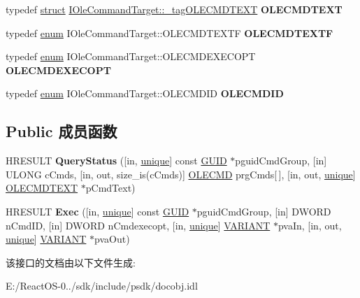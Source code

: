 \begin{DoxyCompactItemize}
\item 
\mbox{\label{interface_i_ole_command_target_a531d269b2d9c7d82670fb4628d83d94d}} 
typedef \hyperlink{interfacestruct}{struct} \hyperlink{struct_i_ole_command_target_1_1__tag_o_l_e_c_m_d_t_e_x_t}{I\+Ole\+Command\+Target\+::\+\_\+tag\+O\+L\+E\+C\+M\+D\+T\+E\+XT} {\bfseries O\+L\+E\+C\+M\+D\+T\+E\+XT}
\item 
\mbox{\label{interface_i_ole_command_target_ad0d07128baf01db2c74e7d0037519484}} 
typedef \hyperlink{interfaceenum}{enum} I\+Ole\+Command\+Target\+::\+O\+L\+E\+C\+M\+D\+T\+E\+X\+TF {\bfseries O\+L\+E\+C\+M\+D\+T\+E\+X\+TF}
\item 
\mbox{\label{interface_i_ole_command_target_a39f3fc8cac067ab8138fb5b3258b28e4}} 
typedef \hyperlink{interfaceenum}{enum} I\+Ole\+Command\+Target\+::\+O\+L\+E\+C\+M\+D\+E\+X\+E\+C\+O\+PT {\bfseries O\+L\+E\+C\+M\+D\+E\+X\+E\+C\+O\+PT}
\item 
\mbox{\label{interface_i_ole_command_target_accaf953172fe4a762d4a0c4c8453652c}} 
typedef \hyperlink{interfaceenum}{enum} I\+Ole\+Command\+Target\+::\+O\+L\+E\+C\+M\+D\+ID {\bfseries O\+L\+E\+C\+M\+D\+ID}
\end{DoxyCompactItemize}
\subsection*{Public 成员函数}
\begin{DoxyCompactItemize}
\item 
\mbox{\label{interface_i_ole_command_target_a17e08d0c34828a1c98c24b525931cb89}} 
H\+R\+E\+S\+U\+LT {\bfseries Query\+Status} (\mbox{[}in, \hyperlink{interfaceunique}{unique}\mbox{]} const \hyperlink{interface_g_u_i_d}{G\+U\+ID} $\ast$pguid\+Cmd\+Group, \mbox{[}in\mbox{]} U\+L\+O\+NG c\+Cmds, \mbox{[}in, out, size\+\_\+is(c\+Cmds)\mbox{]} \hyperlink{struct_i_ole_command_target_1_1__tag_o_l_e_c_m_d}{O\+L\+E\+C\+MD} prg\+Cmds\mbox{[}$\,$\mbox{]}, \mbox{[}in, out, \hyperlink{interfaceunique}{unique}\mbox{]} \hyperlink{struct_i_ole_command_target_1_1__tag_o_l_e_c_m_d_t_e_x_t}{O\+L\+E\+C\+M\+D\+T\+E\+XT} $\ast$p\+Cmd\+Text)
\item 
\mbox{\label{interface_i_ole_command_target_a61914bb83e31724f76e1bd6b51ad2fd0}} 
H\+R\+E\+S\+U\+LT {\bfseries Exec} (\mbox{[}in, \hyperlink{interfaceunique}{unique}\mbox{]} const \hyperlink{interface_g_u_i_d}{G\+U\+ID} $\ast$pguid\+Cmd\+Group, \mbox{[}in\mbox{]} D\+W\+O\+RD n\+Cmd\+ID, \mbox{[}in\mbox{]} D\+W\+O\+RD n\+Cmdexecopt, \mbox{[}in, \hyperlink{interfaceunique}{unique}\mbox{]} \hyperlink{structtag_v_a_r_i_a_n_t}{V\+A\+R\+I\+A\+NT} $\ast$pva\+In, \mbox{[}in, out, \hyperlink{interfaceunique}{unique}\mbox{]} \hyperlink{structtag_v_a_r_i_a_n_t}{V\+A\+R\+I\+A\+NT} $\ast$pva\+Out)
\end{DoxyCompactItemize}


该接口的文档由以下文件生成\+:\begin{DoxyCompactItemize}
\item 
E\+:/\+React\+O\+S-\/0../sdk/include/psdk/docobj.\+idl\end{DoxyCompactItemize}
